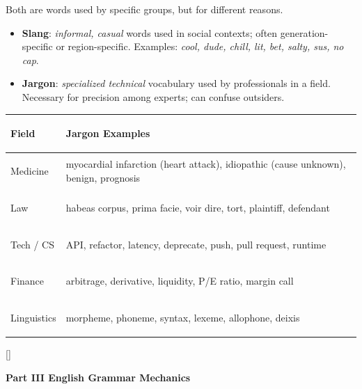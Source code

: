 \documentclass[11pt, letterpaper]{article}
\newcommand{\orangesections}{%
  \titleformat{\section}{\large\bfseries\color{sectionorange}}{}{0em}{}[\color{sectionorange}\titlerule]%
  \titleformat{\subsection}{\normalsize\bfseries\color{sectionorange!80!black}}{}{0em}{}%
}
\newcommand{\partbanner}[3]{%
  \begin{tcolorbox}[colback=#1, colframe=#2, boxrule=1.2pt, arc=4pt,
    left=8pt, right=8pt, top=6pt, bottom=6pt]
    \begin{center}{\LARGE\bfseries #3}\end{center}
  \end{tcolorbox}%
}
\begin{document}
Both are words used by specific groups, but for different reasons.

\begin{itemize}[noitemsep]
  \item \textbf{Slang}: \emph{informal, casual} words used in social contexts; often generation-specific or region-specific. Examples: \emph{cool, dude, chill, lit, bet, salty, sus, no cap}.
  \item \textbf{Jargon}: \emph{specialized technical} vocabulary used by professionals in a field. Necessary for precision among experts; can confuse outsiders.
\end{itemize}

\noindent
{\renewcommand{\arraystretch}{1.5}
\begin{tabularx}{\textwidth}{>{\bfseries\raggedright\arraybackslash}p{2.8cm}
                              >{\raggedright\arraybackslash}X}
\toprule
\rowcolor{tableheadergreen}
\textbf{Field} & \textbf{Jargon Examples} \\
\midrule
\rowcolor{rowA}  Medicine & myocardial infarction (heart attack), idiopathic (cause unknown), benign, prognosis \\
\rowcolor{rowBg} Law      & habeas corpus, prima facie, voir dire, tort, plaintiff, defendant \\
\rowcolor{rowA}  Tech / CS & API, refactor, latency, deprecate, push, pull request, runtime \\
\rowcolor{rowBg} Finance  & arbitrage, derivative, liquidity, P/E ratio, margin call \\
\rowcolor{rowA}  Linguistics & morpheme, phoneme, syntax, lexeme, allophone, deixis \\
\bottomrule
\end{tabularx}}

\newpage

\orangesections
{}
\partbanner{part4bg}{sectionorange}{Part III \quad English Grammar Mechanics}
\end{document}
